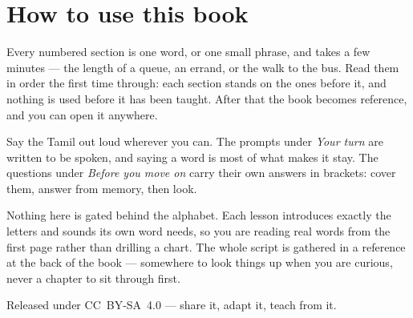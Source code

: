\documentclass[11pt,twoside]{book}
\begin{document}
\section*{How to use this book}

Every numbered section is one word, or one small phrase, and takes a few
minutes --- the length of a queue, an errand, or the walk to the bus. Read them
in order the first time through: each section stands on the ones before it, and
nothing is used before it has been taught. After that the book becomes
reference, and you can open it anywhere.

Say the Tamil out loud wherever you can. The prompts under \emph{Your turn}
are written to be spoken, and saying a word is most of what makes it stay. The
questions under \emph{Before you move on} carry their own answers in brackets:
cover them, answer from memory, then look.

Nothing here is gated behind the alphabet. Each lesson introduces exactly the
letters and sounds its own word needs, so you are reading real words from the
first page rather than drilling a chart. The whole script is gathered in a
reference at the back of the book --- somewhere to look things up when you are
curious, never a chapter to sit through first.

Released under CC~BY-SA~4.0 --- share it, adapt it, teach from it.

\tableofcontents

\mainmatter


\end{document}

